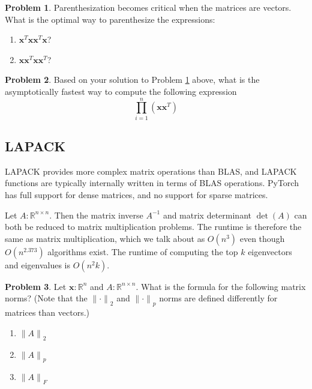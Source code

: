 \documentclass[10pt]{article}
\theoremstyle{definition}
\newtheorem{problem}{Problem}
\newcommand{\R}{\mathbb R}
\DeclareMathOperator{\determinant}{det}
\newcommand{\trans}[1]{{#1}^{T}}
\newcommand{\x}{\mathbf x}
\newcommand{\ltwo}[1]{{\lVert {#1} \rVert}_2}
\newcommand{\lp}[1]{{\lVert {#1} \rVert}_p}
\newcommand{\lF}[1]{{\lVert {#1} \rVert}_F}
\begin{document}
\newpage
\begin{problem}
    \label{prob:8}
    Parenthesization becomes critical when the matrices are vectors.
    What is the optimal way to parenthesize the expressions:
    \begin{enumerate}
        \item
            $\trans \x \x \trans \x \x$?
            \vspace{1in}
        \item
            $\x \trans \x \x \trans \x$?
            \vspace{1in}
    \end{enumerate}
\end{problem}

\begin{problem}
    Based on your solution to Problem \ref{prob:8} above,
    what is the asymptotically fastest way to compute the following expression
    \begin{equation}
        \prod_{i=1}^n (\x \trans \x)
    \end{equation}
    \vspace{2in}
\end{problem}


\subsection{LAPACK}

LAPACK provides more complex matrix operations than BLAS,
and LAPACK functions are typically internally written in terms of BLAS operations.
PyTorch has full support for dense matrices,
and no support for sparse matrices.

Let $A : \R^{n \times n}$.
Then the matrix inverse $A^{-1}$ and matrix determinant $\determinant(A)$ can both be reduced to matrix multiplication problems.
The runtime is therefore the same as matrix multiplication, which we talk about as $O(n^3)$ even though $O(n^{2.373})$ algorithms exist.
The runtime of computing the top $k$ eigenvectors and eigenvalues is $O(n^2k)$.

\begin{problem}
    Let $\x : \R^n$
    and 
    $A : \R^{n\times n}$.
    What is the formula for the following matrix norms?
    (Note that the $\ltwo{\cdot}$ and $\lp{\cdot}$ norms are defined differently for matrices than vectors.)
    \begin{enumerate}
        \item $\ltwo{A}$
            \vspace{1in}
        \item $\lp{A}$
            \vspace{1in}
        \item $\lF{A}$
            \vspace{1in}
    \end{enumerate}
\end{problem}
\end{document}
